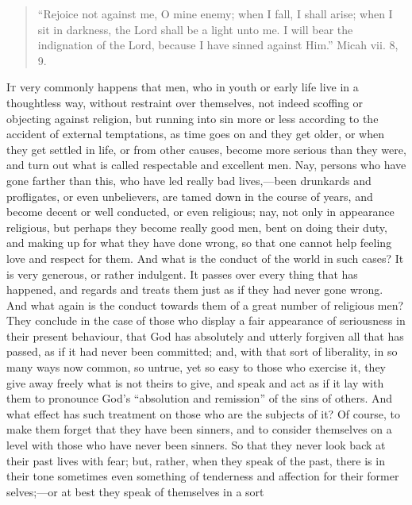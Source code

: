 
\begin{quote}

``Rejoice not against me, O mine enemy; when I fall, I shall
arise; when I sit in darkness, the Lord shall be a light unto me. I
will bear the indignation of the Lord, because I have sinned against
Him.'' Micah vii. 8, 9.

\end{quote}

I\textsc{t} very commonly happens that men, who in youth or early life live
in a thoughtless way, without restraint over themselves, not indeed
scoffing or objecting against religion, but running into sin more or
less according to the accident of external temptations, as time goes
on and they get older, or when they get settled in life, or from other
causes, become more serious than they were, and turn out what is
called respectable and excellent men. Nay, persons who have gone
farther than this, who have led really bad lives,—been drunkards and
profligates, or even unbelievers, are tamed down in the course of
years, and become decent or well conducted, or even religious; nay,
not only in appearance religious, but perhaps they become really good
men, bent on doing their duty, and making up for what they have done
wrong, so that one cannot help feeling love and respect for them. And
what is the conduct of the world in such cases? It is very generous,
or rather indulgent. It passes over every thing that has happened, and
regards and treats them just as if they had never gone wrong. And what
again is the conduct towards them of a great number of religious men?
They conclude in the case of those who display a fair appearance of
seriousness in their present behaviour, that God has absolutely and
utterly forgiven all that has passed, as if it had never been
committed; and, with that sort of liberality, in so many ways now
common, so untrue, yet so easy to those who exercise it, they give
away freely what is not theirs to give, and speak and act as if it lay
with them to pronounce God's ``absolution and remission'' of
the sins of others. And what effect has such treatment on those who
are the subjects of it? Of course, to make them forget that they have
been sinners, and to consider themselves on a level with those who
have never been sinners. So that they never look back at their past
lives with fear; but, rather, when they speak of the past, there is in
their tone sometimes even something of tenderness and affection for
their former selves;—or at best they speak of themselves in a sort

